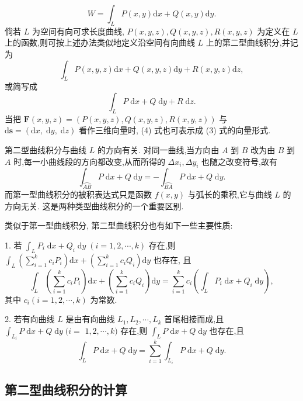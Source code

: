 \[
W = {\int }_{L}P\left( {x,y}\right) \mathrm{d}x + Q\left( {x,y}\right) \mathrm{d}y.
\]
倘若 \(L\) 为空间有向可求长度曲线, \(P\left( {x,y,z}\right) ,Q\left( {x,y,z}\right) ,R\left( {x,y,z}\right)\) 为定义在 \(L\) 上的函数,则可按上述办法类似地定义沿空间有向曲线 \(L\) 上的第二型曲线积分,并记为
\[
{\int }_{L}P\left( {x,y,z}\right) \mathrm{d}x + Q\left( {x,y,z}\right) \mathrm{d}y + R\left( {x,y,z}\right) \mathrm{d}z, \tag{4}
\]
或简写成
\[
{\int }_{L}P\mathrm{\;d}x + Q\mathrm{\;d}y + R\mathrm{\;d}z.
\]
当把 \(\mathbf{F}\left( {x,y,z}\right)  = \left( {P\left( {x,y,z}\right) ,Q\left( {x,y,z}\right) ,R\left( {x,y,z}\right) }\right)\) 与 \(\mathrm{d}\mathbf{s} = \left( {\mathrm{d}x,\mathrm{\;d}y,\mathrm{\;d}z}\right)\) 看作三维向量时, (4) 式也可表示成 (3) 式的向量形式.

第二型曲线积分与曲线 \(L\) 的方向有关. 对同一曲线,当方向由 \(A\) 到 \(B\) 改为由 \(B\) 到 \(A\) 时,每一小曲线段的方向都改变,从而所得的 \(\Delta {x}_{i},\Delta {y}_{i}\) 也随之改变符号,故有
\[
{\int }_{\overset{⏜}{AB}}P\mathrm{\;d}x + Q\mathrm{\;d}y =  - {\int }_{\overset{⏜}{BA}}P\mathrm{\;d}x + Q\mathrm{\;d}y. \tag{5}
\]
而第一型曲线积分的被积表达式只是函数 \(f\left( {x,y}\right)\) 与弧长的乘积,它与曲线 \(L\) 的方向无关. 这是两种类型曲线积分的一个重要区别.

类似于第一型曲线积分, 第二型曲线积分也有如下一些主要性质:

1. 若 \({\int }_{L}{P}_{i}\mathrm{\;d}x + {Q}_{i}\mathrm{\;d}y\;\left( {i = 1,2,\cdots ,k}\right)\) 存在,则 \({\int }_{L}\left( {\mathop{\sum }\limits_{{i = 1}}^{k}{c}_{i}{P}_{i}}\right) \mathrm{d}x + \left( {\mathop{\sum }\limits_{{i = 1}}^{k}{c}_{i}{Q}_{i}}\right) \mathrm{d}y\) 也存在, 且
\[
{\int }_{L}\left( {\mathop{\sum }\limits_{{i = 1}}^{k}{c}_{i}{P}_{i}}\right) \mathrm{d}x + \left( {\mathop{\sum }\limits_{{i = 1}}^{k}{c}_{i}{Q}_{i}}\right) \mathrm{d}y = \mathop{\sum }\limits_{{i = 1}}^{k}{c}_{i}\left( {{\int }_{L}{P}_{i}\mathrm{\;d}x + {Q}_{i}\mathrm{\;d}y}\right) ,
\]
其中 \({c}_{i}\left( {i = 1,2,\cdots ,k}\right)\) 为常数.

2. 若有向曲线 \(L\) 是由有向曲线 \({L}_{1},{L}_{2},\cdots ,{L}_{k}\) 首尾相接而成,且 \({\int }_{{L}_{i}}P\mathrm{\;d}x + Q\mathrm{\;d}y\;(i =\)  \(1,2,\cdots ,k)\) 存在,则 \({\int }_{L}P\mathrm{\;d}x + Q\mathrm{\;d}y\) 也存在,且
\[
{\int }_{L}P\mathrm{\;d}x + Q\mathrm{\;d}y = \mathop{\sum }\limits_{{i = 1}}^{k}{\int }_{{L}_{i}}P\mathrm{\;d}x + Q\mathrm{\;d}y.
\]
\subsection{第二型曲线积分的计算}

